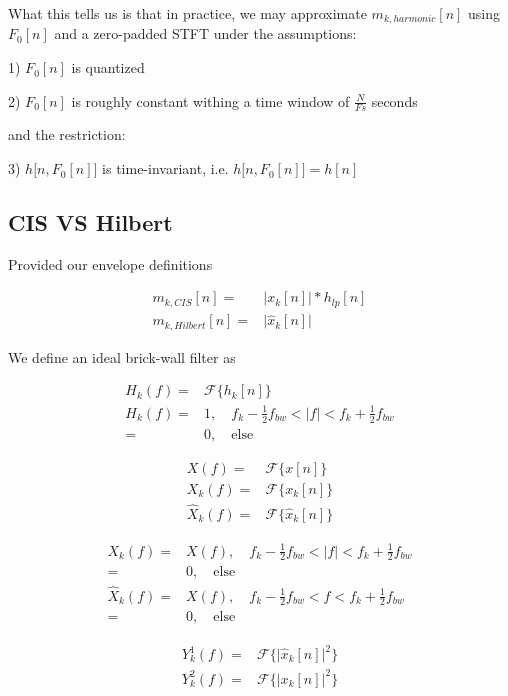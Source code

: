 \documentclass [11pt, proquest,oneside] {ganter_thesis}[2015/03/03]
\begin{document}
What this tells us is that in practice, we may approximate $m_{k,harmonic}[n]$ using $F_0[n]$ and a zero-padded STFT under the assumptions:

1) $F_0[n]$ is quantized

2) $F_0[n]$ is roughly constant withing a time window of $\frac{N}{Fs}$ seconds

and the restriction:

3) $h\Big[n, F_0[n] \Big]$ is time-invariant, i.e. $h\Big[n, F_0[n] \Big] = h[n]$

\subsection{CIS VS Hilbert}

Provided our envelope definitions

\begin{align}
m_{k,CIS}[n] =& \Big| x_k[n] \Big| * h_{lp}[n] \nonumber \\
m_{k,Hilbert}[n] =& \Big| \widehat{x}_k[n] \Big| \nonumber
\end{align}

We define an ideal brick-wall filter as

\begin{align}
H_k(f) =& \mathcal{F}\Big\{ h_k[n]  \Big\} \\
H_k(f) =& 1, \quad f_k - \frac{1}{2} f_{bw} < |f| < f_k + \frac{1}{2} f_{bw} \\
=& 0, \quad \mathrm{else}
\end{align}

\begin{align}
X(f) =& \mathcal{F}\Big\{ x[n] \Big\} \\
X_{k}(f) =& \mathcal{F}\Big\{ x_k[n] \Big\} \\
\widehat{X}_{k}(f) =& \mathcal{F}\Big\{ \widehat{x}_k[n]  \Big\}
\end{align}

\begin{align}
X_{k}(f) =& X(f), \quad f_k - \frac{1}{2} f_{bw} < |f| < f_k + \frac{1}{2} f_{bw} \\
=& 0, \quad \mathrm{else} \\
\widehat{X}_{k}(f) =& X(f), \quad f_k - \frac{1}{2} f_{bw} < f < f_k + \frac{1}{2} f_{bw} \\
=& 0, \quad \mathrm{else}
\end{align}

\begin{align}
Y_{k}^1(f) =& \mathcal{F}\Big\{ \Big| \widehat{x}_k[n] \Big|^2  \Big\} \\
Y_{k}^2(f) =& \mathcal{F}\Big\{ \Big| x_k[n] \Big|^2  \Big\}
\end{align}
\end{document}
